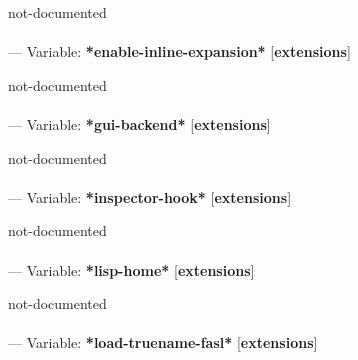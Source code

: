 \begin{adjustwidth}{5em}{5em}
not-documented
\end{adjustwidth}

\paragraph{}
\label{EXTENSIONS:*ENABLE-INLINE-EXPANSION*}
--- Variable: \textbf{*enable-inline-expansion*} [\textbf{extensions}] \textit{}

\begin{adjustwidth}{5em}{5em}
not-documented
\end{adjustwidth}

\paragraph{}
\label{EXTENSIONS:*GUI-BACKEND*}
--- Variable: \textbf{*gui-backend*} [\textbf{extensions}] \textit{}

\begin{adjustwidth}{5em}{5em}
not-documented
\end{adjustwidth}

\paragraph{}
\label{EXTENSIONS:*INSPECTOR-HOOK*}
--- Variable: \textbf{*inspector-hook*} [\textbf{extensions}] \textit{}

\begin{adjustwidth}{5em}{5em}
not-documented
\end{adjustwidth}

\paragraph{}
\label{EXTENSIONS:*LISP-HOME*}
--- Variable: \textbf{*lisp-home*} [\textbf{extensions}] \textit{}

\begin{adjustwidth}{5em}{5em}
not-documented
\end{adjustwidth}

\paragraph{}
\label{EXTENSIONS:*LOAD-TRUENAME-FASL*}
--- Variable: \textbf{*load-truename-fasl*} [\textbf{extensions}] \textit{}

